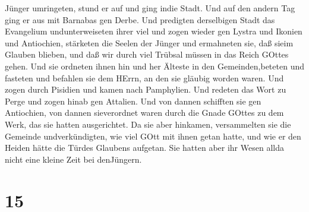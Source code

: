 Jünger umringeten, stund er auf und ging indie Stadt. Und auf den andern
Tag ging er aus mit Barnabas gen Derbe.  Und predigten
derselbigen Stadt das Evangelium undunterweiseten ihrer viel und zogen
wieder gen Lystra und Ikonien und Antiochien,  stärketen
die Seelen der Jünger und ermahneten sie, daß sieim Glauben blieben, und
daß wir durch viel Trübsal müssen in das Reich GOttes gehen.
 Und sie ordneten ihnen hin und her Älteste in den
Gemeinden,beteten und fasteten und befahlen sie dem HErrn, an den sie
gläubig worden waren.  Und zogen durch Pisidien und kamen
nach Pamphylien.  Und redeten das Wort zu Perge und zogen
hinab gen Attalien.  Und von dannen schifften sie gen
Antiochien, von dannen sieverordnet waren durch die Gnade GOttes zu dem
Werk, das sie hatten ausgerichtet.  Da sie aber hinkamen,
versammelten sie die Gemeinde undverkündigten, wie viel GOtt mit ihnen
getan hatte, und wie er den Heiden hätte die Türdes Glaubens aufgetan.
 Sie hatten aber ihr Wesen allda nicht eine kleine Zeit bei
denJüngern.

\hypertarget{section-14}{%
\section{15}\label{section-14}}

